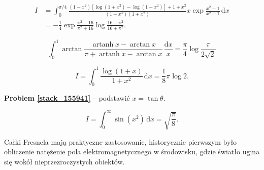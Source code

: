 \begin{problem}[pytanie 815863]
    \label{stack_815863}%
    \begin{align}
        I & = \int_0^{\pi/4} \frac{ (1-x^2) [ \log(1+x^2) - \log(1 - x^2)] + 1 + x^2}{(1-x^4)(1+x^2)} x \exp \frac {x^2 - 1}{x^2 + 1} \,\mathrm{d} x \\
        & =  - \frac 1 4  \exp \frac{\pi^2 - 16}{\pi^2 + 16} \log \frac {16 - \pi^2}{16 + \pi^2}.
    \end{align}
\end{problem}

\begin{problem}[pytanie 464769]
    \label{stack_464769}%
    \begin{equation}
        \int_0^1 \arctan \frac { \operatorname{artanh} x - \arctan x} {\pi + \operatorname{artanh} x - \arctan x}  \, \frac{\mathrm{d}x}{x} = \frac \pi 4 \log \frac{\pi}{2 \sqrt{2}}
    \end{equation}
\end{problem}




\begin{problem}[pytanie 155941]
    \label{stack_155941}%
    \begin{equation}
        I = \int_0^1 \frac{\log (1+x)}{1 + x^2} \,\mathrm{d}x = \frac 1 8 \pi \log 2.
    \end{equation}
\end{problem}

\textbf{Problem \ref{stack_155941}} -- podstawić $x = \tan \theta$. %

\begin{problem}
    \label{stack_187729}%
    \begin{equation}
        I = \int_0^\infty \sin (x^2) \,\mathrm{d} x = \sqrt{\frac \pi 8}.
    \end{equation}
\end{problem}

Całki Fresnela mają praktyczne zastosowanie, historycznie pierwszym było obliczenie natężenie pola elektromagnetycznego w środowisku, gdzie światło ugina się wokół nieprzezroczystych obiektów.

